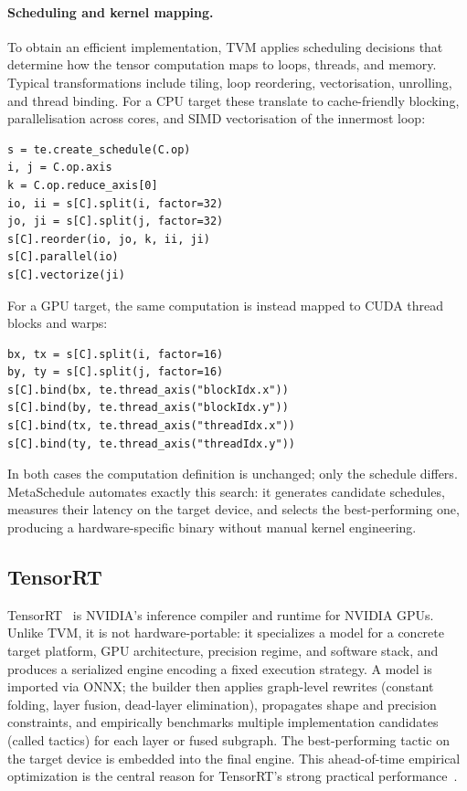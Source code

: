 \documentclass[12pt,a4paper]{report}
\begin{document}
\paragraph{Scheduling and kernel mapping.}
To obtain an efficient implementation, TVM applies scheduling decisions that determine how the tensor
computation maps to loops, threads, and memory.
Typical transformations include tiling, loop reordering, vectorisation, unrolling, and thread binding.
For a CPU target these translate to cache-friendly blocking, parallelisation across cores, and SIMD
vectorisation of the innermost loop:
\begin{verbatim}
s = te.create_schedule(C.op)
i, j = C.op.axis
k = C.op.reduce_axis[0]
io, ii = s[C].split(i, factor=32)
jo, ji = s[C].split(j, factor=32)
s[C].reorder(io, jo, k, ii, ji)
s[C].parallel(io)
s[C].vectorize(ji)
\end{verbatim}
For a GPU target, the same computation is instead mapped to CUDA thread blocks and warps:
\begin{verbatim}
bx, tx = s[C].split(i, factor=16)
by, ty = s[C].split(j, factor=16)
s[C].bind(bx, te.thread_axis("blockIdx.x"))
s[C].bind(by, te.thread_axis("blockIdx.y"))
s[C].bind(tx, te.thread_axis("threadIdx.x"))
s[C].bind(ty, te.thread_axis("threadIdx.y"))
\end{verbatim}
In both cases the computation definition is unchanged; only the schedule differs.
MetaSchedule automates exactly this search: it generates candidate schedules, measures their latency
on the target device, and selects the best-performing one, producing a hardware-specific binary without
manual kernel engineering.


\subsection{TensorRT}

TensorRT~\cite{nvidia_tensorrt_docs} is NVIDIA's inference compiler and runtime for NVIDIA GPUs.
Unlike TVM, it is not hardware-portable: it specializes a model for a concrete target platform, GPU architecture,
precision regime, and software stack, and produces a serialized engine encoding a fixed execution strategy.
A model is imported via ONNX; the builder then applies graph-level rewrites (constant folding, layer fusion,
dead-layer elimination), propagates shape and precision constraints, and empirically benchmarks multiple
implementation candidates (called tactics) for each layer or fused subgraph.
The best-performing tactic on the target device is embedded into the final engine.
This ahead-of-time empirical optimization is the central reason for TensorRT's strong practical
performance~\cite{nvidia_tensorrt_perf}.
\end{document}
